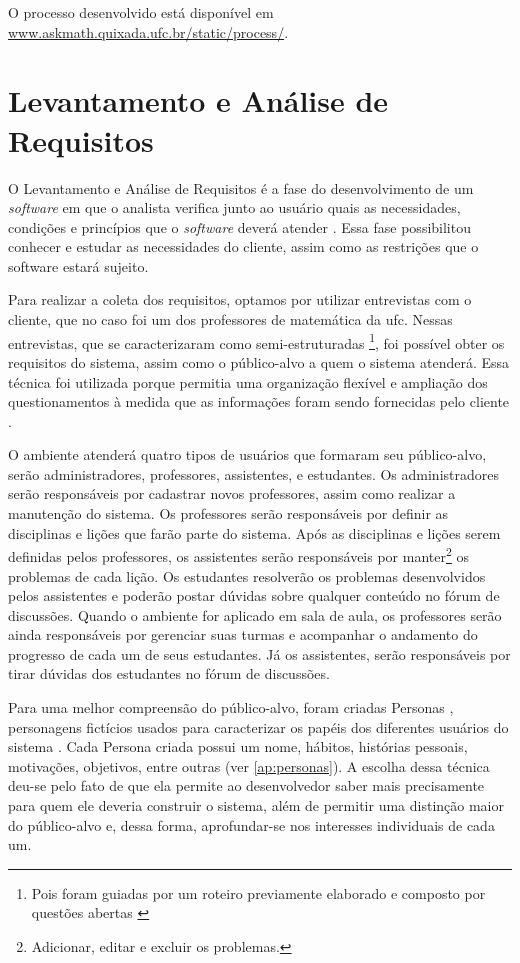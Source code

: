 O processo desenvolvido est\'a dispon\'ivel em \url{www.askmath.quixada.ufc.br/static/process/}. 

\section{Levantamento e Análise de Requisitos}


O Levantamento e An\'alise de Requisitos é a fase do desenvolvimento de um \textit{software} em que o analista verifica junto ao usuário 
quais as necessidades, condições e princípios que o \textit{software} deverá atender \cite{matuda2013mapas}. Essa fase possibilitou 
conhecer e estudar as necessidades do cliente, assim como as restrições que o software estará sujeito.

Para realizar a coleta dos requisitos, optamos por utilizar entrevistas com o cliente, que no caso foi um dos professores de matemática da \gls{ufc}. Nessas entrevistas, que se caracterizaram como semi-estruturadas \footnote{Pois foram guiadas por um 
roteiro previamente elaborado e composto por questões abertas \cite{belei2008uso}}, foi possível obter os requisitos do sistema, assim como 
o público-alvo a quem o sistema atenderá. Essa técnica foi utilizada porque permitia uma organização flexível e ampliação dos 
questionamentos à medida que as informações foram sendo fornecidas pelo cliente \cite{fujisawa2000utilizaccao}.

O ambiente atender\'a quatro tipos de usu\'arios que formaram seu p\'ublico-alvo, ser\~ao administradores, professores, assistentes, e estudantes. Os administradores ser\~ao respons\'aveis por 
cadastrar novos professores, assim como realizar a manuten\c{c}\~ao do sistema. Os professores ser\~ao responsáveis por definir 
as disciplinas e li\c{c}\~oes que far\~ao parte do sistema. 
Ap\'os as disciplinas e li\c{c}\~oes serem definidas pelos professores, os assistentes ser\~ao respons\'aveis por manter\footnote{Adicionar, editar e excluir os problemas.} os problemas de cada 
li\c{c}\~ao. Os estudantes resolver\~ao os problemas desenvolvidos pelos assistentes e poder\~ao postar d\'uvidas sobre qualquer conte\'udo 
no f\'orum de discuss\~oes. Quando o ambiente for aplicado em sala de aula, os professores ser\~ao ainda respons\'aveis por gerenciar suas 
turmas e acompanhar o andamento do progresso de cada um de seus estudantes. J\'a os assistentes, ser\~ao responsáveis por tirar d\'uvidas 
dos estudantes no f\'orum de discuss\~oes.

Para uma melhor compreensão do público-alvo, foram criadas Personas \cite{pruitt2003personas}, personagens fictícios usados para 
caracterizar os papéis dos diferentes usuários do sistema \cite{guerra2010colaboraccao}. Cada Persona criada possui um nome, hábitos, 
histórias pessoais, motivações, objetivos, entre outras (ver \autoref{ap:personas}). A escolha dessa técnica deu-se pelo fato de que ela 
permite ao desenvolvedor saber mais precisamente para 
quem ele deveria construir o sistema, além de permitir uma distinção maior do público-alvo e, dessa forma, aprofundar-se nos interesses individuais de cada um.

